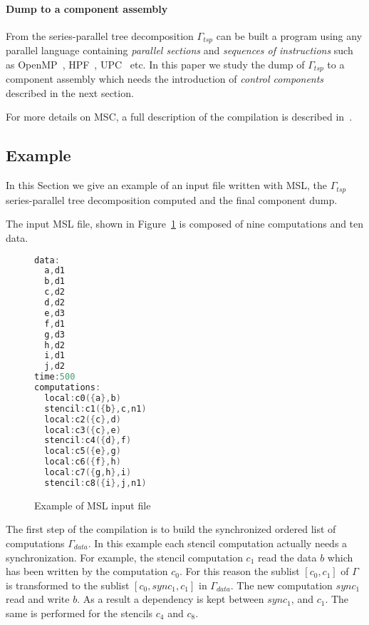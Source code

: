 \paragraph{Dump to a component assembly} From the series-parallel tree decomposition $\Gamma_{tsp}$ can be built a program using any parallel language containing \emph{parallel sections} and \emph{sequences of instructions} such as OpenMP~\cite{660313}, HPF~\cite{219857}, UPC~\cite{El-Ghazawi:2006:UUP:1188455.1188483} etc. In this paper we study the dump of $\Gamma_{tsp}$ to a component assembly which needs the introduction of \emph{control components} described in the next section.

For more details on MSC, a full description of the compilation is described in~\cite{}.

\subsection{Example}
In this Section we give an example of an input file written with MSL, the $\Gamma_{tsp}$ series-parallel tree decomposition computed and the final component dump.

The input MSL file, shown in Figure~\ref{fig:msinput} is composed of nine computations and ten data.

\begin{figure}[h!]
\begin{lstlisting}[basicstyle=\footnotesize,mathescape,frame=single,language=C++]
data:
  a,d1
  b,d1
  c,d2
  d,d2
  e,d3
  f,d1
  g,d3
  h,d2
  i,d1
  j,d2
time:500
computations:
  local:c0({a},b)
  stencil:c1({b},c,n1)
  local:c2({c},d)
  local:c3({c},e)
  stencil:c4({d},f)
  local:c5({e},g)
  local:c6({f},h)
  local:c7({g,h},i)
  stencil:c8({i},j,n1)
\end{lstlisting}
\caption{Example of MSL input file}
\label{fig:msinput}
\end{figure}

The first step of the compilation is to build the synchronized ordered list of computations $\Gamma_{data}$. In this example each stencil computation actually needs a synchronization. For example, the stencil computation $c_1$ read the data $b$ which has been written by the computation $c_0$. For this reason the sublist $[c_0,c_1]$ of $\Gamma$ is transformed to the sublist $[c_0,sync_1,c_1]$ in $\Gamma_{data}$. The new computation $sync_1$ read and write $b$. As a result a dependency is kept between $sync_1$, and $c_1$. The same is performed for the stencils $c_4$ and $c_8$.

